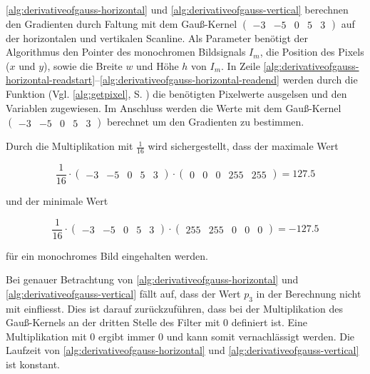 \autoref{alg:derivativeofgauss-horizontal} und \autoref{alg:derivativeofgauss-vertical} berechnen den Gradienten durch Faltung mit dem Gauß-Kernel
$\left( \begin{smallmatrix}
-3& -5& 0& 5& 3
\end{smallmatrix} \right)$
 auf der horizontalen und vertikalen Scanline. Als Parameter benötigt der Algorithmus den Pointer des monochromen
 Bildsignals $I_m$, die Position des Pixels ($x$ und $y$), sowie die Breite $w$ und Höhe $h$ von $I_m$. In Zeile
 \ref{alg:derivativeofgauss-horizontal-readstart}--\ref{alg:derivativeofgauss-horizontal-readend} werden durch die
 Funktion  (Vgl. \autoref{alg:getpixel}, S. \pageref{alg:getpixel}) die benötigten Pixelwerte
 ausgelsen und den Variablen zugewiesen. Im Anschluss werden die Werte mit dem Gauß-Kernel
$\left( \begin{smallmatrix}
-3& -5& 0& 5& 3
\end{smallmatrix} \right)$
berechnet um den Gradienten zu bestimmen.



Durch die Multiplikation mit $\tfrac{1}{16}$ wird sichergestellt, dass der maximale Wert

\begin{equation}
	\frac{1}{16}
	\cdot
	\begin{pmatrix}
		-3& -5& 0& 5& 3
	\end{pmatrix}
	\cdot
	\begin{pmatrix}
		0& 0& 0& 255& 255
	\end{pmatrix}
	= 127.5
\end{equation}

und der minimale Wert

\begin{equation}
	\frac{1}{16}
	\cdot
	\begin{pmatrix}
		-3& -5& 0& 5& 3
	\end{pmatrix}
	\cdot
	\begin{pmatrix}
		255& 255& 0& 0& 0
	\end{pmatrix}
	= -127.5
\end{equation}

für ein monochromes Bild eingehalten werden.

Bei genauer Betrachtung von \autoref{alg:derivativeofgauss-horizontal} und \autoref{alg:derivativeofgauss-vertical}
 fällt auf, dass der Wert $p_3$ in der Berechnung nicht mit einfliesst. Dies ist darauf zurückzuführen, dass bei der
 Multiplikation des Gauß-Kernels an der dritten Stelle des Filter mit $0$ definiert ist. Eine Multiplikation mit $0$
 ergibt immer $0$ und kann somit vernachlässigt werden. Die Laufzeit von \autoref{alg:derivativeofgauss-horizontal} und
 \autoref{alg:derivativeofgauss-vertical} ist konstant.


